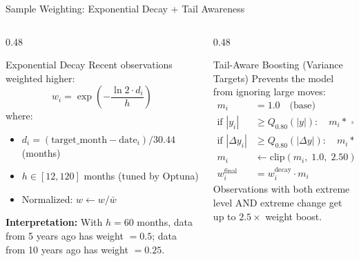 \documentclass[aspectratio=169,10pt]{beamer}
\begin{document}
\begin{frame}{Sample Weighting: Exponential Decay + Tail Awareness}
\begin{columns}[T]
\begin{column}{0.48\textwidth}
\begin{block}{Exponential Decay}
\footnotesize
Recent observations weighted higher:
\[
w_i = \exp\!\left(-\frac{\ln 2 \cdot d_i}{h}\right)
\]
where:
\begin{itemize}\scriptsize
  \item $d_i = (\text{target\_month} - \text{date}_i) / 30.44$ (months)
  \item $h \in [12, 120]$ months (tuned by Optuna)
  \item Normalized: $w \leftarrow w / \bar{w}$
\end{itemize}

\textbf{Interpretation:} With $h = 60$ months, data from 5 years ago has weight $= 0.5$; data from 10 years ago has weight $= 0.25$.
\end{block}
\end{column}
\begin{column}{0.48\textwidth}
\begin{block}{Tail-Aware Boosting (Variance Targets)}
\footnotesize
Prevents the model from ignoring large moves:
\begin{align*}
m_i &= 1.0 \quad \text{(base)} \\
\text{if } |y_i| &\ge Q_{0.80}(|y|): \quad m_i \mathrel{*}= 1.35 \\
\text{if } |\Delta y_i| &\ge Q_{0.80}(|\Delta y|): \quad m_i \mathrel{*}= 1.35 \\
m_i &\leftarrow \text{clip}(m_i,\; 1.0,\; 2.50) \\
w_i^{\text{final}} &= w_i^{\text{decay}} \cdot m_i
\end{align*}
Observations with both extreme level AND extreme change get up to $2.5\times$ weight boost.
\end{block}
\end{column}
\end{columns}
\end{frame}
\end{document}
